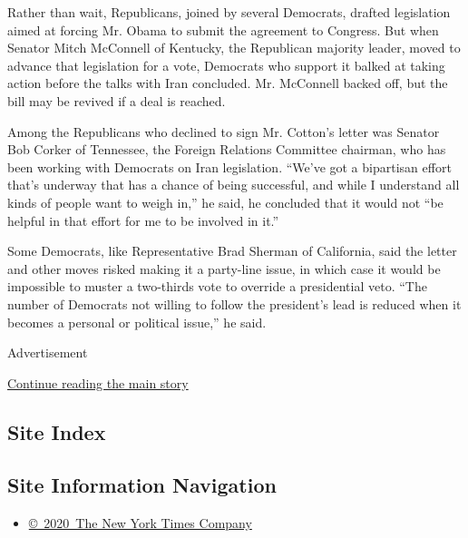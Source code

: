 Rather than wait, Republicans, joined by several Democrats, drafted
legislation aimed at forcing Mr. Obama to submit the agreement to
Congress. But when Senator Mitch McConnell of Kentucky, the Republican
majority leader, moved to advance that legislation for a vote, Democrats
who support it balked at taking action before the talks with Iran
concluded. Mr. McConnell backed off, but the bill may be revived if a
deal is reached.

Among the Republicans who declined to sign Mr. Cotton's letter was
Senator Bob Corker of Tennessee, the Foreign Relations Committee
chairman, who has been working with Democrats on Iran legislation.
``We've got a bipartisan effort that's underway that has a chance of
being successful, and while I understand all kinds of people want to
weigh in,'' he said, he concluded that it would not ``be helpful in that
effort for me to be involved in it.''

Some Democrats, like Representative Brad Sherman of California, said the
letter and other moves risked making it a party-line issue, in which
case it would be impossible to muster a two-thirds vote to override a
presidential veto. ``The number of Democrats not willing to follow the
president's lead is reduced when it becomes a personal or political
issue,'' he said.

Advertisement

\protect\hyperlink{after-bottom}{Continue reading the main story}

\hypertarget{site-index}{%
\subsection{Site Index}\label{site-index}}

\hypertarget{site-information-navigation}{%
\subsection{Site Information
Navigation}\label{site-information-navigation}}

\begin{itemize}
\tightlist
\item
  \href{https://help.nytimes.com/hc/en-us/articles/115014792127-Copyright-notice}{©~2020~The
  New York Times Company}
\end{itemize}

